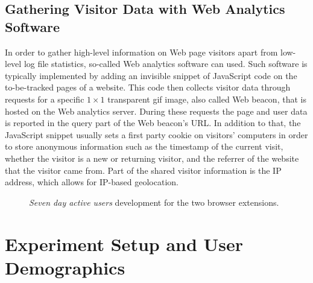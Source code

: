 \documentclass{iosart2c}
\begin{document}
\subsection{Gathering Visitor Data with Web Analytics Software}
In order to gather high-level information on Web page visitors apart from low-level log file statistics, so-called Web analytics software can used.
Such software is typically implemented by adding an invisible snippet of JavaScript code on the to-be-tracked pages of a website.
This code then collects visitor data through requests for a specific $\mathit{1} \times \mathit{1}$ transparent gif image, also called Web beacon, that is hosted on the Web analytics server.
During these requests the page and user data is reported in the query part of the Web beacon's URL.
In addition to that, the JavaScript snippet usually sets a first party cookie on visitors' computers in order to store anonymous information such as the timestamp of the current visit, whether the visitor is a new or returning visitor, and the referrer of the website that the visitor came from.
Part of the shared visitor information is the IP address, which allows for IP-based geolocation.

\begin{figure}
  \centering
    \qquad
\caption{\textit{Seven day active users} development for the two browser extensions.}
\label{fig:swarmnlpstats}
\end{figure}

\section{Experiment Setup and User Demographics} \label{sec:userdemographics}
\end{document}
